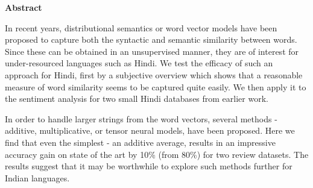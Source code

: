 \cleardoublepage

\begin{center}
	\huge{\textbf{Abstract}}
\end{center}

In recent years, distributional semantics or word vector models have been proposed to capture both the syntactic and semantic similarity between words.  Since these can be obtained in an unsupervised manner, they are of interest for under-resourced languages such as Hindi.  We test the efficacy of such an approach for Hindi, first by a subjective overview which shows that a reasonable measure of word similarity seems to be captured quite easily.  We then apply it to the sentiment analysis for two small Hindi databases from earlier work. 

In order to handle larger strings from the word vectors, several methods - additive, multiplicative, or tensor neural models, have been proposed.  Here we find that even the simplest - an additive average, results in an impressive accuracy gain on state of the art by 10\% (from 80\%) for two review datasets.  The results suggest that it may be worthwhile to explore such methods further for Indian languages.
